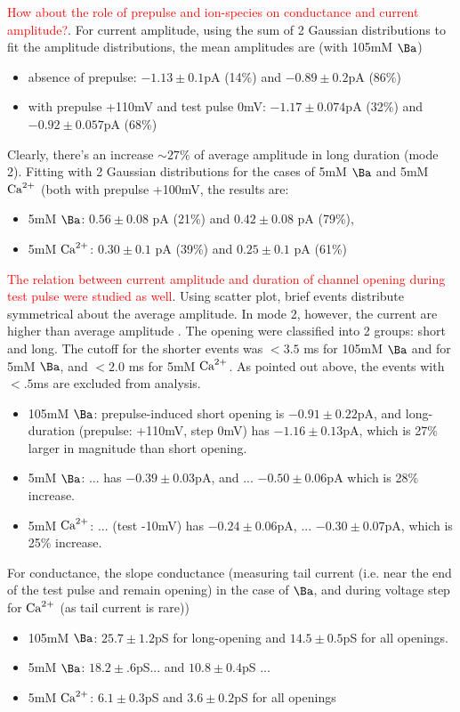 \textcolor{red}{How about the role of prepulse and ion-species on
  conductance and current amplitude?}.
For current amplitude, using the sum of 2 Gaussian distributions to
fit the amplitude distributions, the mean amplitudes are (with 105mM
$\Ba$)
\begin{itemize}
\item absence of prepulse: $-1.13\pm0.1$pA (14\%) and $-0.89\pm0.2$pA
  (86\%)
\item with prepulse +110mV and test pulse 0mV: $-1.17\pm0.074$pA
  (32\%) and $-0.92\pm0.057$pA (68\%)
\end{itemize}
Clearly, there's an increase $\sim 27\%$ of average amplitude in long
duration (mode 2). Fitting with 2 Gaussian distributions for the cases
of 5mM $\Ba$ and 5mM ${\text{Ca}^{2+}}$ (both with prepulse +100mV, the results
are:
\begin{itemize}
\item 5mM $\Ba$: $0.56\pm0.08$ pA (21\%) and $0.42\pm0.08$ pA (79\%),
\item 5mM ${\text{Ca}^{2+}}$: $0.30\pm0.1$ pA (39\%) and $0.25\pm0.1$ pA (61\%)
\end{itemize}

\textcolor{red}{The relation between current amplitude and duration of
  channel opening during test pulse were studied as well}.
Using scatter plot, brief events distribute symmetrical about the
average amplitude. In mode 2, however, the current are higher than
average amplitude \citep{josephson2002mcu}.  The opening were
classified into 2 groups: short and long.  The cutoff for the shorter
events was $<3.5$ ms for 105mM $\Ba$ and for 5mM $\Ba$, and $<2.0$ ms
for 5mM ${\text{Ca}^{2+}}$. As pointed out above, the events with $<.5$ms are
excluded from analysis.
\begin{itemize}
\item 105mM $\Ba$: prepulse-induced short opening is $-0.91\pm0.22$pA,
  and long-duration (prepulse: +110mV, step 0mV) has $-1.16\pm0.13$pA,
  which is 27\% larger in magnitude than short opening.
\item 5mM $\Ba$: ... has $-0.39\pm0.03$pA, and ... $-0.50\pm0.06$pA
  which is 28\% increase.

\item 5mM ${\text{Ca}^{2+}}$: ... (test -10mV) has $-0.24\pm0.06$pA,
  ... $-0.30\pm0.07$pA, which is 25\% increase.
\end{itemize}

For conductance, the slope conductance (measuring tail current
(i.e. near the end of the test pulse and remain opening) in the case
of $\Ba$, and during voltage step for ${\text{Ca}^{2+}}$ (as tail current is rare))
\begin{itemize}
\item 105mM $\Ba$: $25.7\pm1.2$pS for long-opening and $14.5\pm0.5$pS
  for all openings.
\item 5mM $\Ba$: $18.2\pm.6$pS... and $10.8\pm0.4$pS ...
\item 5mM ${\text{Ca}^{2+}}$: $6.1\pm0.3$pS and $3.6\pm0.2$pS for all openings
\end{itemize}


